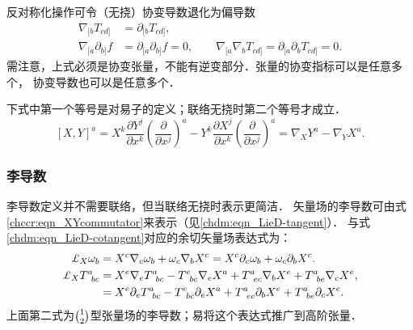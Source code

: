 反对称化操作可令（无挠）协变导数退化为偏导数
\begin{align}
    \nabla_{[b}T_{cd]} &= \partial_{[b}T_{cd]}, \label{chccr:eqn_anti-covD-parD1}\\
    \nabla_{[a}\partial_{b]}f &= \partial_{[a}\partial_{b]}f=0, \qquad
    \nabla_{[a}\nabla_{b}T_{cd]} = \partial_{[a}\partial_{b}T_{cd]}=0. \label{chccr:eqn_anti-covD-parD2}
\end{align}
需注意，上式必须是协变张量，不能有逆变部分．张量的协变指标可以是任意多个，
协变导数也可以是任意多个．



下式中第一个等号是对易子的定义；联络无挠时第二个等号才成立．
\begin{equation}\label{chccr:eqn_XYcommutator}
    \left[ {X,Y} \right]^a = {X^k}\frac{{\partial {Y^j}}}{{\partial {x^k}}}
    {\left( {\frac{\partial }{{\partial {x^j}}}} \right)^a} -
    {Y^k}\frac{{\partial {X^j}}}{{\partial {x^k}}}{\left( {\frac{\partial }{{\partial {x^j}}}} \right)^a}
    = \nabla_X Y^a - \nabla_Y X^a .
\end{equation}



\subsubsection{李导数}\label{chccr:sec_LieD-Nabla}
李导数定义并不需要联络，但当联络无挠时表示更简洁．
矢量场的李导数可由式\eqref{chccr:eqn_XYcommutator}来表示（见\eqref{chdm:eqn_LieD-tangent}）．
与式\eqref{chdm:eqn_LieD-cotangent}对应的余切矢量场表达式为：
\begin{align}
    \Lie_{X} \omega_{b} &= X^c\nabla_c \omega_{b} +  \omega_{c} \nabla_b X^c
     =X^c\partial_c \omega_{b} + \omega_{c} \partial_b X^c . \label{chccr:eqn_LieD-cotangent-Nabla} \\
    \Lie_{X} T^{a}_{\hphantom{a} bc} &= X^e\nabla_e T^{a}_{\hphantom{a} bc}
    - T^{e}_{\hphantom{a} bc} \nabla_e X^a + T^{a}_{\hphantom{a} ec} \nabla_b X^e
    + T^{a}_{\hphantom{a} be} \nabla_c X^e ,  \label{chccr:eqn_LieD-tensor-Nabla} \\
    &= X^e\partial_e T^{a}_{\hphantom{a} bc}
    - T^{e}_{\hphantom{a} bc} \partial_e X^a + T^{a}_{\hphantom{a} ec} \partial_b X^e
    + T^{a}_{\hphantom{a} be} \partial_c X^e .  \label{chccr:eqn_LieD-tensor-Partial}
\end{align}
上面第二式为$\binom{1}{2}$型张量场的李导数；易将这个表达式推广到高阶张量．

